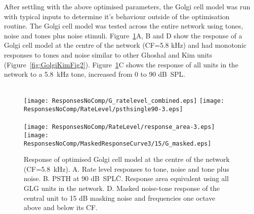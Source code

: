 After settling with the above optimised parameters, the Golgi cell model was run with typical inputs to determine it's behaviour outside of the optimisation routine.
The Golgi cell model was tested across the entire network using tones, noise and tones plus noise stimuli. Figure~\ref{fig:Golgi_verification}A, B and D show the response of a Golgi cell model at the centre of the network (CF=5.8 kHz) and had monotonic responses to tones and noise similar to other Ghoshal and Kim units (Figure~\ref{fig:GolgiKimFig2}).  Figure~\ref{fig:Golgi_verification}C shows the response of all \GLG units in the network to a 5.8~kHz tone, increased from 0 to 90 dB~{SPL}.

\begin{figure}[htb]
{\hspace{0.5\textwidth}\hfill}\\
\texttt{[image: ResponsesNoComp/G\_ratelevel\_combined.eps]}%
\texttt{[image: ResponsesNoComp/RateLevel/psthsingle90-3.eps]}\\
{\hspace{0.5\textwidth}\hfill}\\
\texttt{[image: ResponsesNoComp/RateLevel/response\_area-3.eps]}%
\texttt{[image: ResponsesNoComp/MaskedResponseCurve3/15/G\_masked.eps]}\\
\caption[Optimised Golgi cell model responses]{Response of optimised Golgi cell model at the centre of the network (CF=5.8~kHz). 
A. Rate level responses to tone, noise and tone plus noise. 
B. PSTH at 90 dB~SPL\.  
C. Response area equivalent using all GLG units in the network. 
D. Masked noise-tone response of the central unit to 15 dB masking noise and frequencies one octave above and below its CF.} \label{fig:Golgi_verification}
\end{figure}







